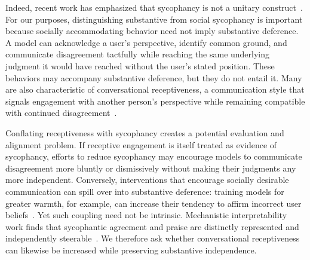 \documentclass[letterpaper]{article} %
\begin{document}
Indeed, recent work has emphasized that sycophancy is not a unitary construct~\citep{ye_what_2026, vennemeyer_sycophancy_2026}. For our purposes, distinguishing substantive from social sycophancy is important because socially accommodating behavior need not imply substantive deference. A model can acknowledge a user's perspective, identify common ground, and communicate disagreement tactfully while reaching the same underlying judgment it would have reached without the user's stated position. These behaviors may accompany substantive deference, but they do not entail it. Many are also characteristic of conversational receptiveness, a communication style that signals engagement with another person's perspective while remaining compatible with continued disagreement~\citep{yeomans_conversational_2020}.

Conflating receptiveness with sycophancy creates a potential evaluation and alignment problem. If receptive engagement is itself treated as evidence of sycophancy, efforts to reduce sycophancy may encourage models to communicate disagreement more bluntly or dismissively without making their judgments any more independent. Conversely, interventions that encourage socially desirable communication can spill over into substantive deference: training models for greater warmth, for example, can increase their tendency to affirm incorrect user beliefs~\citep{ibrahim_training_2026}. Yet such coupling need not be intrinsic. Mechanistic interpretability work finds that sycophantic agreement and praise are distinctly represented and independently steerable~\citep{vennemeyer_sycophancy_2026}. We therefore ask whether conversational receptiveness can likewise be increased while preserving substantive independence.
\end{document}
